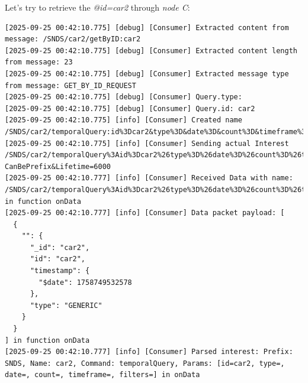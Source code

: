 \documentclass{article}
\begin{document}
\pagebreak 

Let's try to retrieve the \textit{@id=car2} through \emph{node C}:
\begin{lstlisting}[language=log, caption={Node's C log after performing a GET by ID for car2}, label={lst:node-c-log-file-car2}]
[2025-09-25 00:42:10.775] [debug] [Consumer] Extracted content from message: /SNDS/car2/getByID:car2
[2025-09-25 00:42:10.775] [debug] [Consumer] Extracted content length from message: 23
[2025-09-25 00:42:10.775] [debug] [Consumer] Extracted message type from message: GET_BY_ID_REQUEST
[2025-09-25 00:42:10.775] [debug] [Consumer] Query.type: 
[2025-09-25 00:42:10.775] [debug] [Consumer] Query.id: car2
[2025-09-25 00:42:10.775] [info] [Consumer] Created name /SNDS/car2/temporalQuery:id%3Dcar2&type%3D&date%3D&count%3D&timeframe%3D&filters%3D
[2025-09-25 00:42:10.775] [info] [Consumer] Sending actual Interest /SNDS/car2/temporalQuery%3Aid%3Dcar2%26type%3D%26date%3D%26count%3D%26timeframe%3D%26filters%3D?CanBePrefix&Lifetime=6000
[2025-09-25 00:42:10.777] [info] [Consumer] Received Data with name: /SNDS/car2/temporalQuery%3Aid%3Dcar2%26type%3D%26date%3D%26count%3D%26timeframe%3D%26filters%3D in function onData
[2025-09-25 00:42:10.777] [info] [Consumer] Data packet payload: [
  {
    "": {
      "_id": "car2",
      "id": "car2",
      "timestamp": {
        "$date": 1758749532578
      },
      "type": "GENERIC"
    }
  }
] in function onData
[2025-09-25 00:42:10.777] [info] [Consumer] Parsed interest: Prefix: SNDS, Name: car2, Command: temporalQuery, Params: [id=car2, type=, date=, count=, timeframe=, filters=] in onData
\end{lstlisting}

\pagebreak
\end{document}
